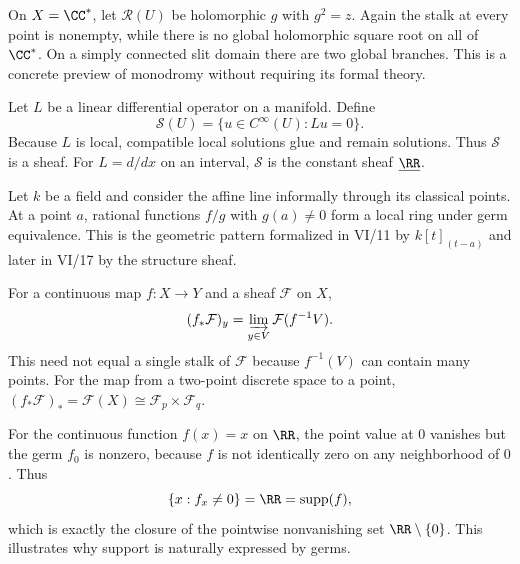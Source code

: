 \begin{example}
On $X=\CC^*$, let $\mathcal R(U)$ be holomorphic $g$ with $g^2=z$.  Again the stalk at every
point is nonempty, while there is no global holomorphic square root on all of $\CC^*$.  On a
simply connected slit domain there are two global branches.  This is a concrete preview of
monodromy without requiring its formal theory.
\end{example}

\begin{example}
Let $L$ be a linear differential operator on a manifold.  Define
\[
\mathcal S(U)=\{u\in C^\infty(U):Lu=0\}.
\]
Because $L$ is local, compatible local solutions glue and remain solutions.  Thus
$\mathcal S$ is a sheaf.  For $L=d/dx$ on an interval, $\mathcal S$ is the constant sheaf
$\underline\RR$.
\end{example}

\begin{example}
Let $k$ be a field and consider the affine line informally through its classical points.  At
a point $a$, rational functions $f/g$ with $g(a)\neq0$ form a local ring under germ
equivalence.  This is the geometric pattern formalized in VI/11 by $k[t]_{(t-a)}$ and later
in VI/17 by the structure sheaf.
\end{example}

\begin{example}
For a continuous map $f:X\to Y$ and a sheaf $\mathcal F$ on $X$,
\[
(f_*\mathcal F)_y=\varinjlim_{y\in V}\mathcal F(f^{-1}V).
\]
This need not equal a single stalk of $\mathcal F$ because $f^{-1}(V)$ can contain many
points.  For the map from a two-point discrete space to a point,
$(f_*\mathcal F)_*=\mathcal F(X)\cong\mathcal F_p\times\mathcal F_q$.
\end{example}

\begin{example}
For the continuous function $f(x)=x$ on $\RR$, the point value at $0$ vanishes but the germ
$f_0$ is nonzero, because $f$ is not identically zero on any neighborhood of $0$.  Thus
\[
\{x:f_x\neq0\}=\RR=\operatorname{supp}(f),
\]
which is exactly the closure of the pointwise nonvanishing set $\RR\setminus\{0\}$.
This illustrates why support is naturally expressed by germs.
\end{example}

